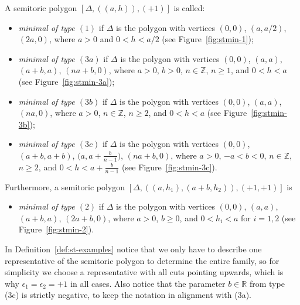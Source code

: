 \documentclass[pdftex]{sigma}
\numberwithin{equation}{section}
\def\R{{\mathbb R}}
\def\Z{{\mathbb Z}}
\newcommand{\De}{\Delta}
\begin{document}
\begin{Definition}
\label{def:st-examples}
A semitoric polygon $[\De,((a,h)),(+1)]$ is called:
\begin{itemize}\itemsep=0pt
 \item \emph{minimal of type $(1)$} if $\De$ is the polygon with vertices $(0,0)$, $(a,a/2)$, $(2a,0)$, where $a>0$ and $0<h<a/2$ (see Figure~\ref{fig:stmin-1});
 \item \emph{minimal of type $(3a)$} if $\De$ is the polygon with vertices $(0,0)$, $(a,a)$, $(a+b,a)$, $(na+b, 0)$,
 where $a>0$, $b>0$, $n\in\Z$, $n\geq 1$, and $0<h<a$ (see Figure~\ref{fig:stmin-3a});
 \item \emph{minimal of type $(3b)$} if $\De$ is the polygon with vertices $(0,0)$, $(a,a)$, $(na, 0)$,
 where $a>0$, $n\in\Z$, $n\geq 2$, and $0<h<a$ (see Figure~\ref{fig:stmin-3b});
 \item \emph{minimal of type $(3c)$} if $\De$ is the polygon with vertices $(0,0)$, $(a+b,a+b)$, $\big(a,a+\frac{b}{n-1}\big)$, $(na+b,0)$,
 where $a>0$, $-a<b<0$, $n\in\Z$, $n\geq 2$, and $0<h<a+\frac{b}{n-1}$ (see Figure~\ref{fig:stmin-3c}).
\end{itemize}
Furthermore, a semitoric polygon $[\De,((a,h_1), (a+b,h_2)),(+1,+1)]$ is
\begin{itemize}\itemsep=0pt
 \item \emph{minimal of type $(2)$} if $\De$ is the polygon with vertices $(0,0)$, $(a,a)$, $(a+b,a)$, $(2a+b,0)$,
 where $a>0$, $b\geq 0$, and $0<h_i<a$ for $i=1,2$ (see Figure~\ref{fig:stmin-2}).
\end{itemize}
\end{Definition}


In Definition~\ref{def:st-examples} notice that we only have to describe one representative of the semitoric polygon to determine the entire family, so for simplicity we choose a representative with all cuts pointing upwards, which is why $\epsilon_1=\epsilon_2=+1$ in all cases.
Also notice that the parameter $b\in\R$ from type (3c) is strictly negative, to keep the notation in alignment with (3a).
\end{document}

